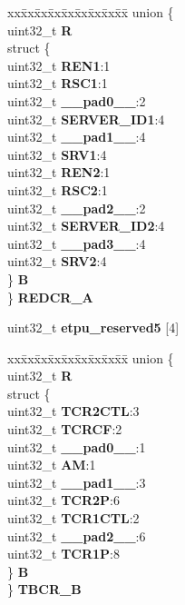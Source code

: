 \begin{DoxyCompactItemize}
\begin{tabbing}
\end{tabbing}\item 
\mbox{\label{structETPU__tag_adeef79aaa2d873f461fb9536a333f6fe}} 
\begin{tabbing}
xx\=xx\=xx\=xx\=xx\=xx\=xx\=xx\=xx\=\kill
union \{\\
\>uint32\_t {\bfseries R}\\
\>struct \{\\
\>\>uint32\_t {\bfseries REN1}:1\\
\>\>uint32\_t {\bfseries RSC1}:1\\
\>\>uint32\_t {\bfseries \_\_pad0\_\_}:2\\
\>\>uint32\_t {\bfseries SERVER\_ID1}:4\\
\>\>uint32\_t {\bfseries \_\_pad1\_\_}:4\\
\>\>uint32\_t {\bfseries SRV1}:4\\
\>\>uint32\_t {\bfseries REN2}:1\\
\>\>uint32\_t {\bfseries RSC2}:1\\
\>\>uint32\_t {\bfseries \_\_pad2\_\_}:2\\
\>\>uint32\_t {\bfseries SERVER\_ID2}:4\\
\>\>uint32\_t {\bfseries \_\_pad3\_\_}:4\\
\>\>uint32\_t {\bfseries SRV2}:4\\
\>\} {\bfseries B}\\
\} {\bfseries REDCR\_A}\\

\end{tabbing}\item 
\mbox{\label{structETPU__tag_a89b048dc349d7489e7b89639b2355523}} 
uint32\+\_\+t {\bfseries etpu\+\_\+reserved5} \mbox{[}4\mbox{]}
\item 
\mbox{\label{structETPU__tag_a6a1ee3681580ddfdfffcf00621d52830}} 
\begin{tabbing}
xx\=xx\=xx\=xx\=xx\=xx\=xx\=xx\=xx\=\kill
union \{\\
\>uint32\_t {\bfseries R}\\
\>struct \{\\
\>\>uint32\_t {\bfseries TCR2CTL}:3\\
\>\>uint32\_t {\bfseries TCRCF}:2\\
\>\>uint32\_t {\bfseries \_\_pad0\_\_}:1\\
\>\>uint32\_t {\bfseries AM}:1\\
\>\>uint32\_t {\bfseries \_\_pad1\_\_}:3\\
\>\>uint32\_t {\bfseries TCR2P}:6\\
\>\>uint32\_t {\bfseries TCR1CTL}:2\\
\>\>uint32\_t {\bfseries \_\_pad2\_\_}:6\\
\>\>uint32\_t {\bfseries TCR1P}:8\\
\>\} {\bfseries B}\\
\} {\bfseries TBCR\_B}\\


\end{tabbing}
\end{DoxyCompactItemize}
